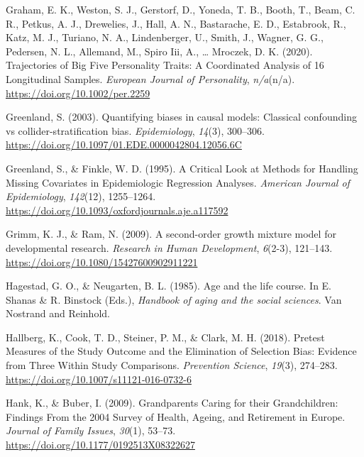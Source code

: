 \documentclass[
  english,
  man, noextraspace]{apa7}
\begin{document}
\leavevmode\hypertarget{ref-grahamTrajectoriesBigFive2020}{}%
Graham, E. K., Weston, S. J., Gerstorf, D., Yoneda, T. B., Booth, T., Beam, C. R., Petkus, A. J., Drewelies, J., Hall, A. N., Bastarache, E. D., Estabrook, R., Katz, M. J., Turiano, N. A., Lindenberger, U., Smith, J., Wagner, G. G., Pedersen, N. L., Allemand, M., Spiro Iii, A., \ldots{} Mroczek, D. K. (2020). Trajectories of Big Five Personality Traits: A Coordinated Analysis of 16 Longitudinal Samples. \emph{European Journal of Personality}, \emph{n/a}(n/a). \url{https://doi.org/10.1002/per.2259}

\leavevmode\hypertarget{ref-greenlandQuantifyingBiasesCausal2003}{}%
Greenland, S. (2003). Quantifying biases in causal models: Classical confounding vs collider-stratification bias. \emph{Epidemiology}, \emph{14}(3), 300--306. \url{https://doi.org/10.1097/01.EDE.0000042804.12056.6C}

\leavevmode\hypertarget{ref-greenlandCriticalLookMethods1995}{}%
Greenland, S., \& Finkle, W. D. (1995). A Critical Look at Methods for Handling Missing Covariates in Epidemiologic Regression Analyses. \emph{American Journal of Epidemiology}, \emph{142}(12), 1255--1264. \url{https://doi.org/10.1093/oxfordjournals.aje.a117592}

\leavevmode\hypertarget{ref-grimmSecondorderGrowthMixture2009}{}%
Grimm, K. J., \& Ram, N. (2009). A second-order growth mixture model for developmental research. \emph{Research in Human Development}, \emph{6}(2-3), 121--143. \url{https://doi.org/10.1080/15427600902911221}

\leavevmode\hypertarget{ref-hagestadAgeLifeCourse1985}{}%
Hagestad, G. O., \& Neugarten, B. L. (1985). Age and the life course. In E. Shanas \& R. Binstock (Eds.), \emph{Handbook of aging and the social sciences}. Van Nostrand and Reinhold.

\leavevmode\hypertarget{ref-hallbergPretestMeasuresStudy2018}{}%
Hallberg, K., Cook, T. D., Steiner, P. M., \& Clark, M. H. (2018). Pretest Measures of the Study Outcome and the Elimination of Selection Bias: Evidence from Three Within Study Comparisons. \emph{Prevention Science}, \emph{19}(3), 274--283. \url{https://doi.org/10.1007/s11121-016-0732-6}

\leavevmode\hypertarget{ref-hankGrandparentsCaringTheir2009}{}%
Hank, K., \& Buber, I. (2009). Grandparents Caring for their Grandchildren: Findings From the 2004 Survey of Health, Ageing, and Retirement in Europe. \emph{Journal of Family Issues}, \emph{30}(1), 53--73. \url{https://doi.org/10.1177/0192513X08322627}
\end{document}
